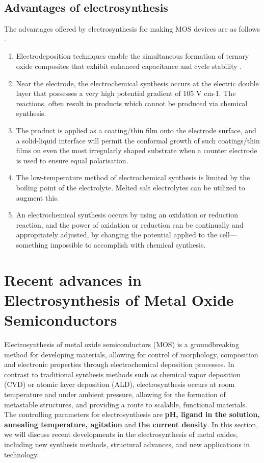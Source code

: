 \documentclass[12pt,a4paper]{report}
\begin{document}
	
	\section{Advantages of electrosynthesis}
	The advantages offered by electrosynthesis for making MOS devices are as follows -
	\begin{enumerate}
		\item {Electrodeposition techniques enable the simultaneous formation of ternary oxide composites that exhibit enhanced capacitance and cycle stability} \cite{Abebe2022}.
		
		\item {Near the electrode, the electrochemical synthesis occurs at the electric double layer that possesses a very high potential gradient of 105 V cm-1. The reactions, often result in products which cannot be produced via chemical synthesis.}
		
		\item {The product is applied as a coating/thin film onto the electrode surface, and a solid-liquid interface will permit the conformal growth of such coatings/thin films on even the most irregularly shaped substrate when a counter electrode is used to ensure equal polarisation.} \cite{Therese2000}
		
		\item{The low-temperature method of electrochemical synthesis is limited by the boiling point of the electrolyte. 
		Melted salt electrolytes can be utilized to augment this.} 
		
		\item{An electrochemical synthesis occurs by using an oxidation or reduction reaction, and the power of oxidation or reduction can be continually and appropriately adjusted, by changing the potential applied to the cell—something impossible to accomplish with chemical synthesis.}
		
	\end{enumerate}
	
	
	\chapter{Recent advances in Electrosynthesis of Metal Oxide Semiconductors}
	Electrosynthesis of metal oxide semiconductors (MOS) is a groundbreaking method for developing materials, allowing for control of morphology, composition and electronic properties through electrochemical deposition processes. In contrast to traditional synthesis methods such as chemical vapor deposition (CVD) or atomic layer deposition (ALD), electrosynthesis occurs at room temperature and under ambient pressure, allowing for the formation of metastable structures, and providing a route to scalable, functional materials. The controlling parameters for electrosynthesis are \textbf{pH, ligand in the solution, annealing temperature, agitation} and \textbf{the current density}. In this section, we will discuss recent developments in the electrosynthesis of metal oxides, including new synthesis methods, structural advances, and new applications in technology. 
	
\end{document}
